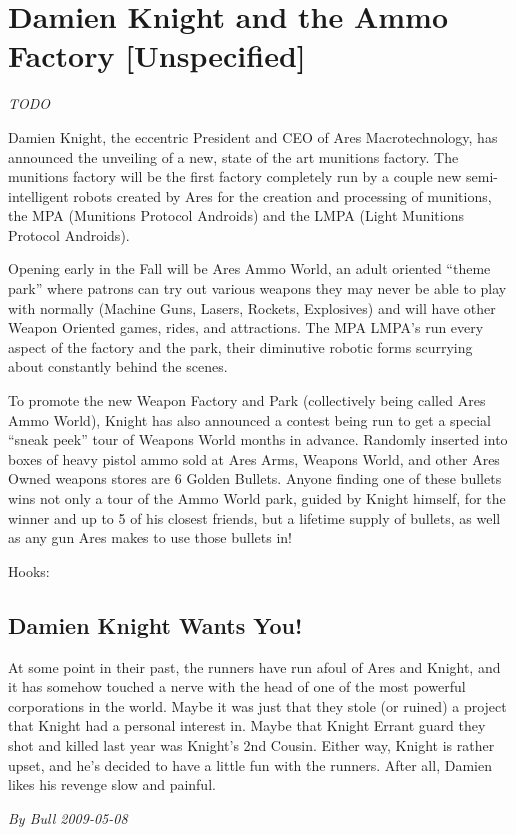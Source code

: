 \documentclass[letterpaper,twocolumn,10.5pt]{article}
\newenvironment{scenario}[6]
	{
		\section{#1 {\small[#2]}}
		\textit{#3}
		\def\TMPSCENARIO{#4 #5}
	}
	{\small\textit{By \TMPSCENARIO}}
\begin{document}
\begin{scenario}{Damien Knight and the Ammo Factory}
	{Unspecified}
	{TODO}
	{Bull}
	{2009-05-08}
	{https://forum.rpg.net/showthread.php?321504-Shadowrun-4th-101-Instant-Scenarios\&p=10333900#post10333900}

Damien Knight, the eccentric President and CEO of Ares Macrotechnology, has announced the unveiling of a new, state of the art munitions factory. The munitions factory will be the first factory completely run by a couple new semi-intelligent robots created by Ares for the creation and processing of munitions, the MPA (Munitions Protocol Androids) and the LMPA (Light Munitions Protocol Androids).

Opening early in the Fall will be Ares Ammo World, an adult oriented ``theme park'' where patrons can try out various weapons they may never be able to play with normally (Machine Guns, Lasers, Rockets, Explosives) and will have other Weapon Oriented games, rides, and attractions. The MPA LMPA's run every aspect of the factory and the park, their diminutive robotic forms scurrying about constantly behind the scenes.

To promote the new Weapon Factory and Park (collectively being called Ares Ammo World), Knight has also announced a contest being run to get a special ``sneak peek'' tour of Weapons World months in advance. Randomly inserted into boxes of heavy pistol ammo sold at Ares Arms, Weapons World, and other Ares Owned weapons stores are 6 Golden Bullets. Anyone finding one of these bullets wins not only a tour of the Ammo World park, guided by Knight himself, for the winner and up to 5 of his closest friends, but a lifetime supply of bullets, as well as any gun Ares makes to use those bullets in!

Hooks:

\subsection{Damien Knight Wants You!}

At some point in their past, the runners have run afoul of Ares and Knight, and it has somehow touched a nerve with the head of one of the most powerful corporations in the world. Maybe it was just that they stole (or ruined) a project that Knight had a personal interest in. Maybe that Knight Errant guard they shot and killed last year was Knight's 2nd Cousin. Either way, Knight is rather upset, and he's decided to have a little fun with the runners. After all, Damien likes his revenge slow and painful.


\end{scenario}
\end{document}
